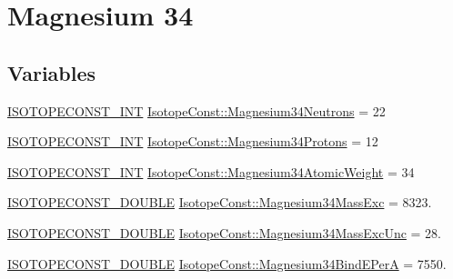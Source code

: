 \hypertarget{group___isotope_const-_magnesium-_mg34}{}\section{Magnesium 34}
\label{group___isotope_const-_magnesium-_mg34}
\subsection*{Variables}
\begin{DoxyCompactItemize}
\item 
\mbox{\hyperlink{group___isotope_const-_macros_ga5f18360b3e99483a35c32d789e62621c}{I\+S\+O\+T\+O\+P\+E\+C\+O\+N\+S\+T\+\_\+\+I\+NT}} \mbox{\hyperlink{group___isotope_const-_magnesium-_mg34_gaec63d462014fccb075c52c7354bcc214}{Isotope\+Const\+::\+Magnesium34\+Neutrons}} = 22
\item 
\mbox{\hyperlink{group___isotope_const-_macros_ga5f18360b3e99483a35c32d789e62621c}{I\+S\+O\+T\+O\+P\+E\+C\+O\+N\+S\+T\+\_\+\+I\+NT}} \mbox{\hyperlink{group___isotope_const-_magnesium-_mg34_gade0910768af4518500bda8bcb3e80065}{Isotope\+Const\+::\+Magnesium34\+Protons}} = 12
\item 
\mbox{\hyperlink{group___isotope_const-_macros_ga5f18360b3e99483a35c32d789e62621c}{I\+S\+O\+T\+O\+P\+E\+C\+O\+N\+S\+T\+\_\+\+I\+NT}} \mbox{\hyperlink{group___isotope_const-_magnesium-_mg34_ga9e116095f6487ce51f26fd0d227dfb2b}{Isotope\+Const\+::\+Magnesium34\+Atomic\+Weight}} = 34
\item 
\mbox{\hyperlink{group___isotope_const-_macros_ga8f45a7272ce02c0b4c65c44636ed719a}{I\+S\+O\+T\+O\+P\+E\+C\+O\+N\+S\+T\+\_\+\+D\+O\+U\+B\+LE}} \mbox{\hyperlink{group___isotope_const-_magnesium-_mg34_gaebb025152e856681332e34f462e0a80f}{Isotope\+Const\+::\+Magnesium34\+Mass\+Exc}} = 8323.
\item 
\mbox{\hyperlink{group___isotope_const-_macros_ga8f45a7272ce02c0b4c65c44636ed719a}{I\+S\+O\+T\+O\+P\+E\+C\+O\+N\+S\+T\+\_\+\+D\+O\+U\+B\+LE}} \mbox{\hyperlink{group___isotope_const-_magnesium-_mg34_gab2722af4b8e668dc9ddd3e8b3f28719e}{Isotope\+Const\+::\+Magnesium34\+Mass\+Exc\+Unc}} = 28.
\item 
\mbox{\hyperlink{group___isotope_const-_macros_ga8f45a7272ce02c0b4c65c44636ed719a}{I\+S\+O\+T\+O\+P\+E\+C\+O\+N\+S\+T\+\_\+\+D\+O\+U\+B\+LE}} \mbox{\hyperlink{group___isotope_const-_magnesium-_mg34_ga6955d584c30051c0d51bc5fd2f8fd04f}{Isotope\+Const\+::\+Magnesium34\+Bind\+E\+PerA}} = 7550.
\item 

\end{DoxyCompactItemize}
